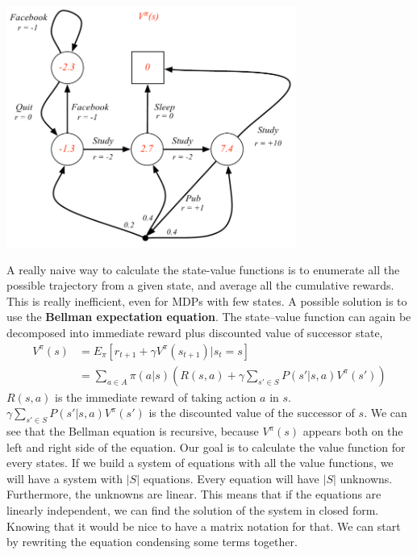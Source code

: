 \documentclass[main.tex]{subfiles}
\begin{document}
\begin{center}
    \includegraphics[width=95mm]{img/MDP_ValueFunction.PNG}
\end{center}
A really naive way to calculate the state-value functions is to enumerate all the possible trajectory from a given state, and average all the cumulative rewards. This is really inefficient, even for MDPs with few states. A possible solution is to use the \textbf{Bellman expectation equation}. The state–value function can again be decomposed into immediate reward plus discounted value of successor state,
\begin{align*}
    V^{\pi}(s) & = E_{\pi}[r_{t+1} + \gamma V^{\pi}(s_{t+1})|s_t=s]                            \\
               & = \sum_{a\in A} \pi(a|s)(R(s,a) + \gamma \sum_{s' \in S}P(s'|s,a)V^{\pi}(s'))
\end{align*}
$R(s,a)$ is the immediate reward of taking action $a$ in $s$. $\gamma \sum_{s' \in S} P(s'|s,a)V^{\pi}(s')$ is the discounted value of the successor of $s$.
We can see that the Bellman equation is recursive, because $V^{\pi}(s)$ appears both on the left and right side of the equation\footnotemark.
Our goal is to calculate the value function for every states. If we build a system of equations with all the value functions, we will have a system with $|S|$ equations. Every equation will have $|S|$ unknowns. Furthermore, the unknowns are linear. This means that if the equations are linearly independent, we can find the solution of the system in closed form. Knowing that it would be nice to have a matrix notation for that.
We can start by rewriting the equation condensing some terms together.
\end{document}
